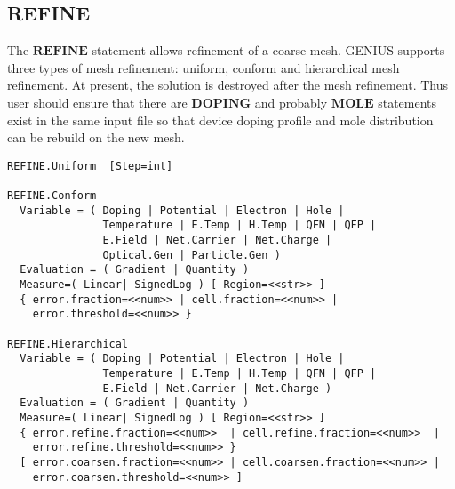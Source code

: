 \documentclass[oneside,12pt]{cgd_book}
\begin{document}
\subsection{REFINE}
The $\mathbf{REFINE}$
statement allows refinement of a coarse mesh. GENIUS supports three
        types of mesh refinement: uniform, conform and hierarchical mesh refinement. At present, the solution is
        destroyed after the mesh refinement. Thus user should ensure that there are
$\mathbf{DOPING}$ and
        probably $\mathbf{MOLE}$ statements exist in the same input file so that device doping profile and mole
        distribution can be rebuild on the new mesh.
\par
\begin{lstlisting}[style=GeniusCmd]
REFINE.Uniform  [Step=int]

REFINE.Conform
  Variable = ( Doping | Potential | Electron | Hole |
               Temperature | E.Temp | H.Temp | QFN | QFP |
               E.Field | Net.Carrier | Net.Charge |
               Optical.Gen | Particle.Gen )
  Evaluation = ( Gradient | Quantity )
  Measure=( Linear| SignedLog ) [ Region=<<str>> ]
  { error.fraction=<<num>> | cell.fraction=<<num>> |
    error.threshold=<<num>> }

REFINE.Hierarchical
  Variable = ( Doping | Potential | Electron | Hole |
               Temperature | E.Temp | H.Temp | QFN | QFP |
               E.Field | Net.Carrier | Net.Charge )
  Evaluation = ( Gradient | Quantity )
  Measure=( Linear| SignedLog ) [ Region=<<str>> ]
  { error.refine.fraction=<<num>>  | cell.refine.fraction=<<num>>  |
    error.refine.threshold=<<num>> }
  [ error.coarsen.fraction=<<num>> | cell.coarsen.fraction=<<num>> |
    error.coarsen.threshold=<<num>> ]
\end{lstlisting}
\end{document}
